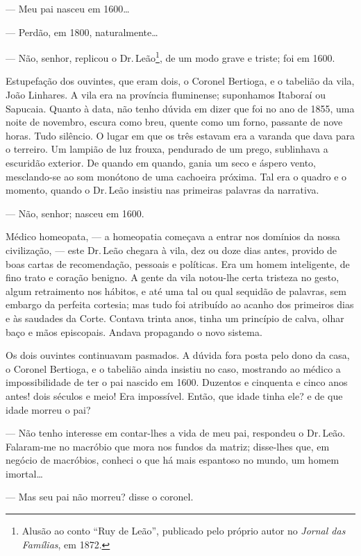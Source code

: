 --- Meu pai nasceu em 1600\ldots{}

--- Perdão, em 1800, naturalmente\ldots{}

--- Não, senhor, replicou o Dr.\,Leão\footnote{Alusão ao conto ``Ruy de
  Leão'', publicado pelo próprio autor no \emph{Jornal das Famílias}, em
  1872.}, de um modo grave e triste; foi em 1600.

Estupefação dos ouvintes, que eram dois, o Coronel Bertioga, e o
tabelião da vila, João Linhares. A vila era na província fluminense;
suponhamos Itaboraí ou Sapucaia. Quanto à data, não tenho dúvida em
dizer que foi no ano de 1855, uma noite de novembro, escura como breu,
quente como um forno, passante de nove horas. Tudo silêncio. O lugar em
que os três estavam era a varanda que dava para o terreiro. Um lampião
de luz frouxa, pendurado de um prego, sublinhava a escuridão exterior.
De quando em quando, gania um seco e áspero vento, mesclando-se ao som
monótono de uma cachoeira próxima. Tal era o quadro e o momento, quando
o Dr.\,Leão insistiu nas primeiras palavras da narrativa.

--- Não, senhor; nasceu em 1600.

Médico homeopata, --- a homeopatia começava a entrar nos domínios da
nossa civilização, --- este Dr.\,Leão chegara à vila, dez ou doze dias
antes, provido de boas cartas de recomendação, pessoais e políticas. Era
um homem inteligente, de fino trato e coração benigno. A gente da vila
notou-lhe certa tristeza no gesto, algum retraimento nos hábitos, e até
uma tal ou qual sequidão de palavras, sem embargo da perfeita cortesia;
mas tudo foi atribuído ao acanho dos primeiros dias e às saudades da
Corte. Contava trinta anos, tinha um princípio de calva, olhar baço e
mãos episcopais. Andava propagando o novo sistema.

Os dois ouvintes continuavam pasmados. A dúvida fora posta pelo dono da
casa, o Coronel Bertioga, e o tabelião ainda insistiu no caso, mostrando
ao médico a impossibilidade de ter o pai nascido em 1600. Duzentos e
cinquenta e cinco anos antes! dois séculos e meio! Era impossível.
Então, que idade tinha ele? e de que idade morreu o pai?

--- Não tenho interesse em contar-lhes a vida de meu pai, respondeu o
Dr.\,Leão. Falaram-me no macróbio que mora nos fundos da matriz;
disse-lhes que, em negócio de macróbios, conheci o que há mais espantoso
no mundo, um homem imortal\ldots{}

--- Mas seu pai não morreu? disse o coronel.

